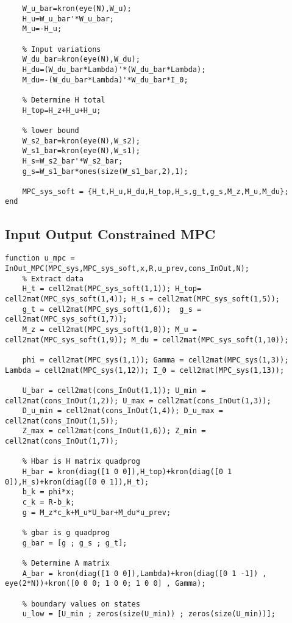 \begin{bilag}
\begin{appendices}
\begin{lstlisting}[breaklines]
    % Input to reference input
    W_u_bar=kron(eye(N),W_u);
    H_u=W_u_bar'*W_u_bar;
    M_u=-H_u;
    
    % Input variations
    W_du_bar=kron(eye(N),W_du);
    H_du=(W_du_bar*Lambda)'*(W_du_bar*Lambda);
    M_du=-(W_du_bar*Lambda)'*W_du_bar*I_0;
    
    % Determine H total
    H_top=H_z+H_u+H_u;
    
    % lower bound
    W_s2_bar=kron(eye(N),W_s2);   
    W_s1_bar=kron(eye(N),W_s1);
    H_s=W_s2_bar'*W_s2_bar;
    g_s=W_s1_bar*ones(size(W_s1_bar,2),1);

    MPC_sys_soft = {H_t,H_u,H_du,H_top,H_s,g_t,g_s,M_z,M_u,M_du};
end
\end{lstlisting}

\subsection{Input Output Constrained MPC}
\label{app:InOut_MPC}
\begin{lstlisting}[breaklines]
function u_mpc = InOut_MPC(MPC_sys,MPC_sys_soft,x,R,u_prev,cons_InOut,N);
    % Extract data
    H_t = cell2mat(MPC_sys_soft(1,1)); H_top= cell2mat(MPC_sys_soft(1,4)); H_s = cell2mat(MPC_sys_soft(1,5));
    g_t = cell2mat(MPC_sys_soft(1,6));  g_s = cell2mat(MPC_sys_soft(1,7));
    M_z = cell2mat(MPC_sys_soft(1,8)); M_u = cell2mat(MPC_sys_soft(1,9)); M_du = cell2mat(MPC_sys_soft(1,10));

    phi = cell2mat(MPC_sys(1,1)); Gamma = cell2mat(MPC_sys(1,3)); Lambda = cell2mat(MPC_sys(1,12)); I_0 = cell2mat(MPC_sys(1,13)); 
    
    U_bar = cell2mat(cons_InOut(1,1)); U_min = cell2mat(cons_InOut(1,2)); U_max = cell2mat(cons_InOut(1,3)); 
    D_u_min = cell2mat(cons_InOut(1,4)); D_u_max = cell2mat(cons_InOut(1,5));
    Z_max = cell2mat(cons_InOut(1,6)); Z_min = cell2mat(cons_InOut(1,7));

    % Hbar is H matrix quadprog
    H_bar = kron(diag([1 0 0]),H_top)+kron(diag([0 1 0]),H_s)+kron(diag([0 0 1]),H_t);
    b_k = phi*x;
    c_k = R-b_k;
    g = M_z*c_k+M_u*U_bar+M_du*u_prev;
    
    % gbar is g quadprog
    g_bar = [g ; g_s ; g_t];
    
    % Determine A matrix
    A_bar = kron(diag([1 0 0]),Lambda)+kron(diag([0 1 -1]) , eye(2*N))+kron([0 0 0; 1 0 0; 1 0 0] , Gamma);

    % boundary values on states
    u_low = [U_min ; zeros(size(U_min)) ; zeros(size(U_min))];
    

\end{lstlisting}
\end{appendices}
\end{bilag}
